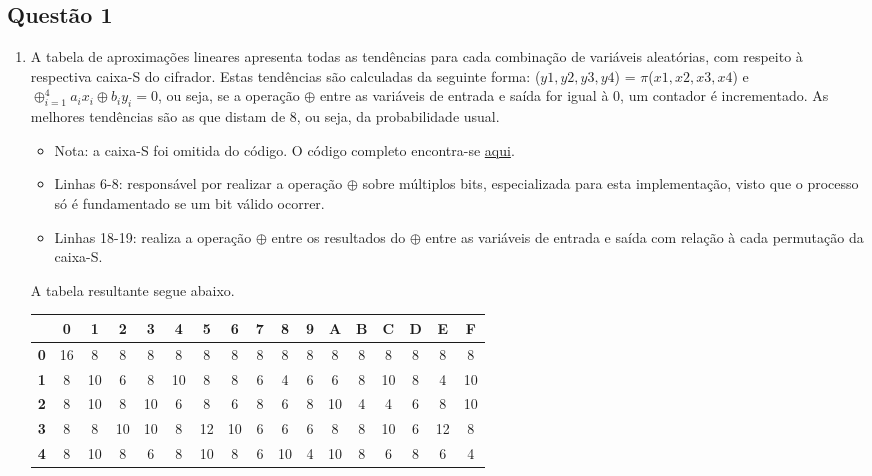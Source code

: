 \documentclass{article}
\begin{document}
\subsection*{Questão 1}
\begin{enumerate}
\item A tabela de aproximações lineares apresenta todas as tendências para cada combinação de variáveis aleatórias, com respeito à respectiva caixa-S do cifrador. Estas tendências são calculadas da seguinte forma: ($y1, y2, y3, y4$) = $\pi$($x1, x2, x3, x4$) e $\oplus^{4}_{i=1} a_{i}x_{i} \oplus b_{i}y_{i} = 0$, ou seja, se a operação $\oplus$ entre as variáveis de entrada e saída for igual à 0, um contador é incrementado. As melhores tendências são as que distam de 8, ou seja, da probabilidade usual.
\begin{itemize}

\item Nota: a caixa-S foi omitida do código. O código completo encontra-se \href{https://raw.githubusercontent.com/zambonin/UFSC-INE5451/master/T2/nl.py}{aqui}.
\item Linhas 6-8: responsável por realizar a operação $\oplus$ sobre múltiplos bits, especializada para esta implementação, visto que o processo só é fundamentado se um bit válido ocorrer.
\item Linhas 18-19: realiza a operação $\oplus$ entre os resultados do $\oplus$ entre as variáveis de entrada e saída com relação à cada permutação da caixa-S.
\end{itemize}
A tabela resultante segue abaixo.\newline
\\
\begin{tabular}{|c|c|c|c|c|c|c|c|c|c|c|c|c|c|c|c|c|}
\hline
& \textbf{0} & \textbf{1} & \textbf{2} & \textbf{3} & \textbf{4} & \textbf{5} & \textbf{6} & \textbf{7} & \textbf{8} & \textbf{9} & \textbf{A} & \textbf{B} & \textbf{C} & \textbf{D} & \textbf{E} & \textbf{F} \\ \hline
\textbf{0} & 16 & 8 & 8 & 8 & 8 & 8 & 8 & 8 & 8 & 8 & 8 & 8 & 8 & 8 & 8 & 8 \\ \hline
\textbf{1} & 8 & 10 & 6 & 8 & 10 & 8 & 8 & 6 & 4 & 6 & 6 & 8 & 10 & 8 & 4 & 10 \\ \hline
\textbf{2} & 8 & 10 & 8 & 10 & 6 & 8 & 6 & 8 & 6 & 8 & 10 & 4 & 4 & 6 & 8 & 10 \\ \hline
\textbf{3} & 8 & 8 & 10 & 10 & 8 & 12 & 10 & 6 & 6 & 6 & 8 & 8 & 10 & 6 & 12 & 8 \\ \hline
\textbf{4} & 8 & 10 & 8 & 6 & 8 & 10 & 8 & 6 & 10 & 4 & 10 & 8 & 6 & 8 & 6 & 4 \\ \hline

\end{tabular}
\end{enumerate}
\end{document}
